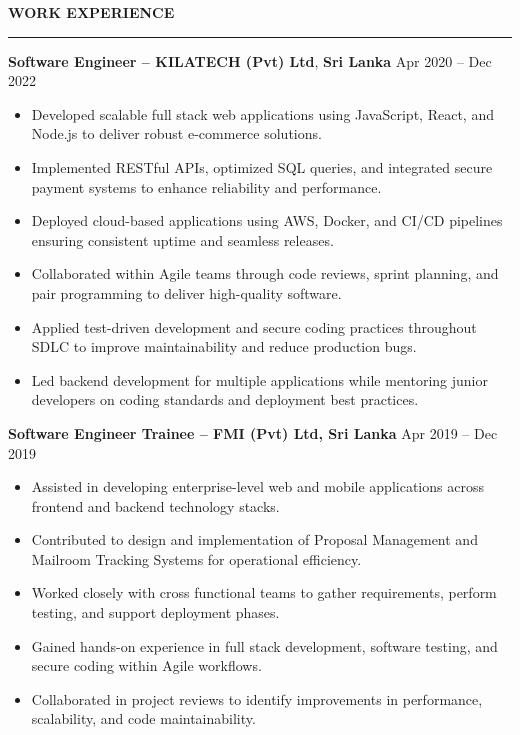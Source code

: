 \documentclass[10pt,letterpaper]{article}
\begin{document}
\vspace{8pt}

\textbf{WORK EXPERIENCE}\\[-8pt]
\noindent\rule{\textwidth}{1pt}

\vspace{-2pt}

\textbf{Software Engineer -- KILATECH (Pvt) Ltd}, \textbf{Sri Lanka} \hfill Apr 2020 -- Dec 2022

\vspace{-1pt}

\begin{itemize}
\item Developed scalable full stack web applications using JavaScript, React, and Node.js to deliver robust e-commerce solutions.
\item Implemented RESTful APIs, optimized SQL queries, and integrated secure payment systems to enhance reliability and performance.
\item Deployed cloud-based applications using AWS, Docker, and CI/CD pipelines ensuring consistent uptime and seamless releases.
\item Collaborated within Agile teams through code reviews, sprint planning, and pair programming to deliver high-quality software.
\item Applied test-driven development and secure coding practices throughout SDLC to improve maintainability and reduce production bugs.
\item Led backend development for multiple applications while mentoring junior developers on coding standards and deployment best practices.
\end{itemize}

\textbf{Software Engineer Trainee -- FMI (Pvt) Ltd, Sri Lanka} \hfill Apr 2019 -- Dec 2019

\vspace{-1pt}

\begin{itemize}
\item Assisted in developing enterprise-level web and mobile applications across frontend and backend technology stacks.
\item Contributed to design and implementation of Proposal Management and Mailroom Tracking Systems for operational efficiency.
\item Worked closely with cross functional teams to gather requirements, perform testing, and support deployment phases.
\item Gained hands-on experience in full stack development, software testing, and secure coding within Agile workflows.
\item Collaborated in project reviews to identify improvements in performance, scalability, and code maintainability.
\end{itemize}
\end{document}
